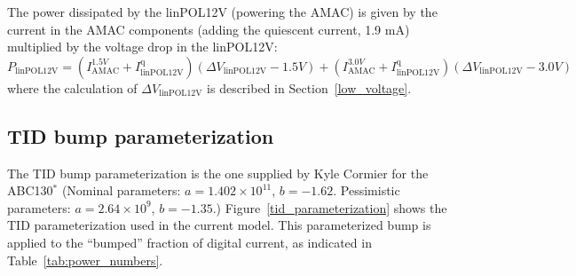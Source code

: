 The power dissipated by the linPOL12V (powering the AMAC) is given by the current in the AMAC components
(adding the quiescent current, 1.9 mA) multiplied by the voltage drop in the linPOL12V:
\begin{equation}
P_\text{linPOL12V} = (I^{1.5V}_\text{AMAC} + I^\text{q}_\text{linPOL12V})\left(  \Delta V_\text{linPOL12V} - 1.5V \right)
                   + (I^{3.0V}_\text{AMAC} + I^\text{q}_\text{linPOL12V})\left(  \Delta V_\text{linPOL12V} - 3.0V \right)
\label{eq:amac_regulator}
\end{equation}
where the calculation of $\Delta V_\text{linPOL12V}$ is described in Section~\ref{low_voltage}.

\subsection{TID bump parameterization}
\label{tid_parameterization_details}

The TID bump parameterization is the one supplied by Kyle Cormier for the ABC130$^{*}$
(Nominal parameters: $a=1.402\times 10^{11}$, $b=-1.62$.
Pessimistic parameters: $a=2.64\times10^{9}$, $b=-1.35$.)
Figure~\ref{tid_parameterization} shows the TID parameterization used in the current model. This
parameterized bump is applied to the ``bumped'' fraction of digital current, as indicated in
Table~\ref{tab:power_numbers}.

